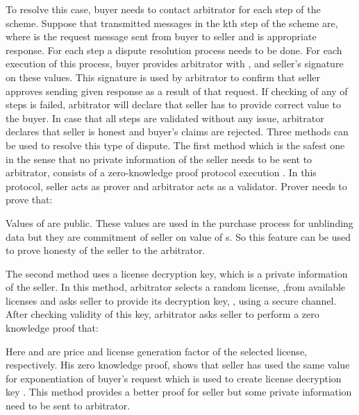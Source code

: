 \documentclass[times]{secauth}
\begin{document}
To resolve this case, buyer needs to contact arbitrator for each step of the scheme. Suppose that transmitted messages in the kth step of the scheme are,  where  is the request message sent from buyer to seller and  is appropriate response. For each step a dispute resolution process needs to be done. For each execution of this process, buyer provides arbitrator with , and seller's signature on these values. This signature is used by arbitrator to confirm that seller approves sending given response as a result of that request. If checking of any of steps is failed, arbitrator will declare that seller has to provide correct value to the buyer. In case that all steps are validated without any issue, arbitrator declares that seller is honest and buyer's claims are rejected.
Three methods can be used to resolve this type of dispute. The first method which is the safest one in the sense that no private information of the seller needs to be sent to arbitrator, consists of a zero-knowledge proof protocol execution \cite{N36, N37}. In this protocol, seller acts as prover and arbitrator acts as a validator. Prover needs to prove that:

\begin{center}

\end{center}

Values of  are public. These values are used in the purchase process for unblinding data but they are commitment of seller on value of s. So this feature can be used to prove honesty of the seller to the arbitrator.

The second method uses a license decryption key, which is a private information of the seller. In this method, arbitrator selects a random license, ,from available licenses and asks seller to provide its decryption key, , using a secure channel. After checking validity of this key, arbitrator asks seller to perform a zero knowledge proof \cite{N37, N38}  that:

\begin{center}

\end{center}

Here  and  are price and license generation factor of the selected license, respectively. His zero knowledge proof, shows that seller has used the same value for exponentiation of buyer's request which is used to create license decryption key . This method provides a better proof for seller but some private information need to be sent to arbitrator.
\end{document}

